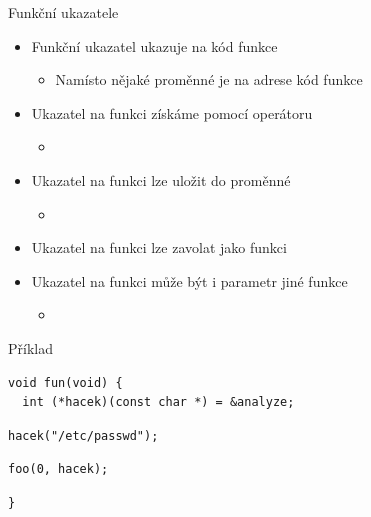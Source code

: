 \begin{frame}[fragile]{Funkční ukazatele}

  \begin{itemize}
    \item Funkční ukazatel ukazuje na kód funkce
    \begin{itemize}
      \item Namísto nějaké proměnné je na adrese kód funkce
    \end{itemize}

    \pause

    \item Ukazatel na funkci získáme pomocí operátoru \code{\&}
    \begin{itemize}
      \item {}
    \end{itemize}

    \pause

    \item Ukazatel na funkci lze uložit do proměnné
    \begin{itemize}
      \item {}
    \end{itemize}

    \pause

    \item Ukazatel na funkci lze zavolat jako funkci

    \pause

    \item Ukazatel na funkci může být i parametr jiné funkce
    \begin{itemize}
      \item {}
    \end{itemize}

  \end{itemize}


\begin{block}{Příklad}
\begin{lstlisting}
void fun(void) {
  int (*hacek)(const char *) = &analyze;
\end{lstlisting}
\begin{lstlisting}[belowskip=0pt]
  hacek("/etc/passwd");
\end{lstlisting}
\begin{lstlisting}[aboveskip=0pt,belowskip=0pt]
  foo(0, hacek);
\end{lstlisting}
\begin{lstlisting}[aboveskip=0pt]
}
\end{lstlisting}
\end{block}

\end{frame}

